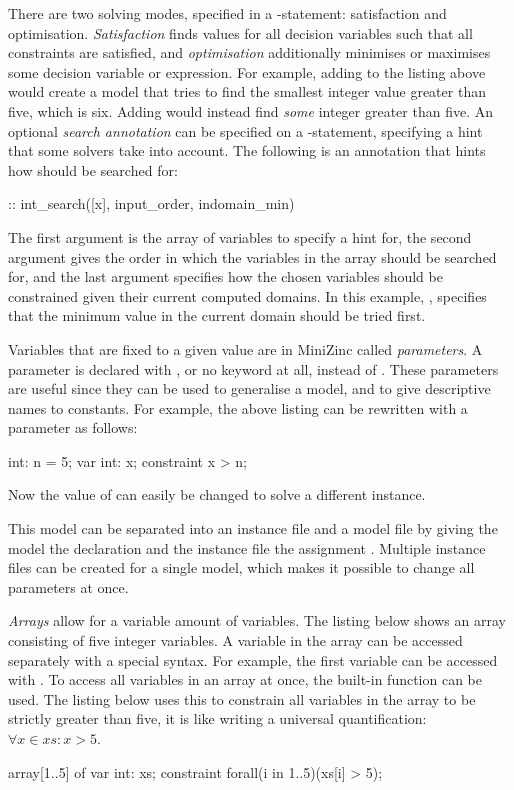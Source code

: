 \documentclass[a4paper,12pt]{article}
\begin{document}
\begin{sloppypar}
There are two solving modes, specified in a -statement: satisfaction and optimisation. \emph{Satisfaction}
finds values for all decision variables such that all constraints are satisfied, and
\emph{optimisation} additionally minimises or maximises some decision variable or expression.
For example, adding  to the listing above would create a
model that tries to find the smallest integer value greater than five, which is
six. Adding  would instead find \emph{some} integer greater than
five. An optional \emph{search annotation} can be specified on a -statement, specifying
a hint that some solvers take into account. The following is an annotation that
hints how  should be searched for:
\end{sloppypar}
\begin{mznnobreak}
:: int_search([x], input_order, indomain_min)
\end{mznnobreak}
The first argument is the array of variables to specify a hint for, the
second argument gives the order in which the variables in the array should be searched for,
and the last argument specifies how the chosen variables should be constrained given their
current computed domains. In this example, , specifies that the minimum
value in the current domain should be tried first.

Variables that are fixed to a given value are in MiniZinc called \emph{parameters}.
A parameter is declared with , or no keyword at all, instead of .
These parameters are useful since they can be used to generalise a model, and to give descriptive names to constants.
For example, the above listing can be rewritten with a parameter as follows:
\begin{mznnobreak}
int: n = 5;
var int: x;
constraint x > n;
\end{mznnobreak}
Now the value of  can easily be changed to solve a different instance.

This model can be separated into an instance file and a model file by giving
the model the declaration  and the
instance file the assignment . Multiple instance files can be created
for a single model, which makes it possible to change all parameters at once.

\emph{Arrays} allow for a variable amount of variables. The listing below shows an array 
consisting of five integer variables. A variable in the array can be accessed separately with
a special syntax. For example, the first variable can be accessed with
.
To access all variables in an array at once, the built-in function  can be used.
The listing below uses this to constrain all variables in the array to be strictly greater
than five, it is like writing a universal quantification: $\forall x \in xs : x > 5$.
\begin{mznnobreak}
array[1..5] of var int: xs;
constraint forall(i in 1..5)(xs[i] > 5);
\end{mznnobreak}
\end{document}
